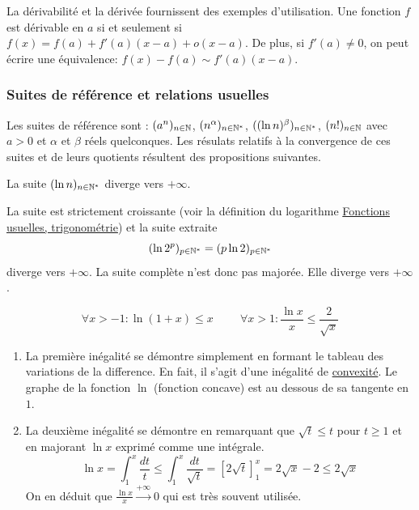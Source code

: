 La dérivabilité et la dérivée fournissent des exemples d'utilisation. Une fonction $f$ est dérivable en $a$ si et seulement si $f(x) =f(a) + f'(a)(x-a) +o(x-a)$. De plus, si $f'(a)\neq 0$, on peut écrire une équivalence: $f(x)-f(a) \sim f'(a)(x-a)$.


\subsubsection{Suites de référence et relations usuelles}
Les suites de référence sont : $(a^n)_{n\in\mathbb{N}}$, $(n^\alpha)_{n\in\mathbb{N}^*}$, $((\ln n)^\beta)_{n\in\mathbb{N}^*}$, $(n!)_{n\in\mathbb{N}}$ avec $a>0$ et $\alpha$ et $\beta$ réels quelconques. Les résulats relatifs à la convergence de ces suites et de leurs quotients résultent des propositions suivantes.
\begin{prop}
 La suite $(\ln n)_{n\in\mathbb{N}^*}$ diverge vers $+\infty$.
\end{prop}
\begin{demo}
 La suite est strictement croissante (voir la définition du logarithme \href{\baseurl C2004.pdf}{Fonctions usuelles, trigonométrie}) et la suite extraite
\begin{displaymath}
 (\ln 2^p)_{p\in\mathbb{N}^*} = (p\ln 2)_{p\in\mathbb{N}^*}
\end{displaymath}
diverge vers $+\infty$. La suite complète n'est donc pas majorée. Elle diverge vers $+\infty$.
\end{demo}
\begin{prop}
 \[
  \forall x>-1 : \ln(1+x) \leq x \hspace{1cm}
  \forall x>1 : \frac{\ln x}{x}\leq \frac{2}{\sqrt{x}}
 \]
\end{prop}
\begin{demo}
 \begin{enumerate}
 \item La première inégalité se démontre simplement en formant le tableau des variations de la difference. En fait, il s'agit d'une inégalité de \href{\baseurl C2071.pdf}{convexité}. Le graphe de la fonction $\ln$ (fonction concave) est au dessous de sa tangente en $1$.
\item La deuxième inégalité se démontre en remarquant que $\sqrt{t} \leq t$ pour $t\geq 1$ et en majorant $\ln x $ exprimé comme une intégrale.
\begin{displaymath}
 \ln x =\int_1^x\frac{dt}{t} \leq \int_1^x \frac{dt}{\sqrt{t}} = \left[ 2\sqrt{t}\right]_{1}^{x}=2\sqrt{x}-2\leq 2\sqrt{x} 
\end{displaymath}
On en déduit que $\frac{\ln x}{x}\xrightarrow{+\infty} 0$ qui est très souvent utilisée.
\end{enumerate}
\end{demo}
